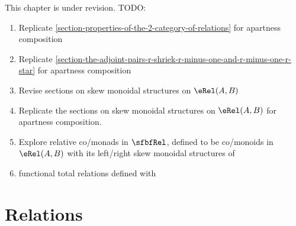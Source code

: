 This chapter is under revision. TODO:
\begin{enumerate}
    \item Replicate \cref{section-properties-of-the-2-category-of-relations} for apartness composition
    \item Replicate \cref{section-the-adjoint-pairs-r-shriek-r-minus-one-and-r-minus-one-r-star} for apartness composition
    \item Revise sections on skew monoidal structures on $\eRel(A,B)$
    \item Replicate the sections on skew monoidal structures on $\eRel(A,B)$ for apartness composition.
    \item Explore relative co/monads in $\sfbfRel$, defined to be co/monoids in $\eRel(A,B)$ with its left/right skew monoidal structures of 
    \item functional total relations defined with 
\end{enumerate}

\ChapterTableOfContents

\section{Relations}\label{section-relations}
